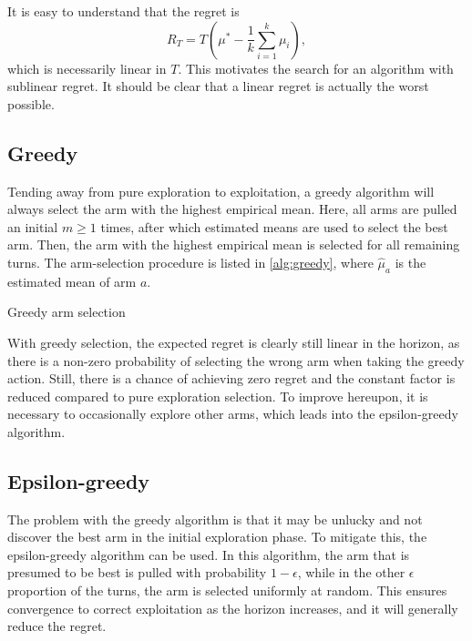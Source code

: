 It is easy to understand that the regret is
\begin{equation}
    R_T = T\left(\mu^* - \frac{1}{k}\sum_{i=1}^k \mu_i\right),
\end{equation}
which is necessarily linear in $T$.
This motivates the search for an algorithm with sublinear regret.
It should be clear that a linear regret is actually the worst possible.

\subsection{Greedy}
Tending away from pure exploration to exploitation, a greedy algorithm will always select the arm with the highest empirical mean.
Here, all arms are pulled an initial $m \geq 1$ times, after which estimated means are used to select the best arm.
Then, the arm with the highest empirical mean is selected for all remaining turns.
The arm-selection procedure is listed in \cref{alg:greedy}, where $\hat{\mu}_a$ is the estimated mean of arm $a$.

\begin{algorithm}
    \caption{Greedy arm selection}
    \label{alg:greedy}
     
\end{algorithm}


With greedy selection, the expected regret is clearly still linear in the horizon, as there is a non-zero probability of selecting the wrong arm when taking the greedy action.
Still, there is a chance of achieving zero regret and the constant factor is reduced compared to pure exploration selection.
To improve hereupon, it is necessary to occasionally explore other arms, which leads into the epsilon-greedy algorithm.

\subsection{Epsilon-greedy}
The problem with the greedy algorithm is that it may be unlucky and not discover the best arm in the initial exploration phase.
To mitigate this, the epsilon-greedy algorithm can be used.
In this algorithm, the arm that is presumed to be best is pulled with probability $1-\epsilon$, while in the other $\epsilon$ proportion of the turns, the arm is selected uniformly at random.
This ensures convergence to correct exploitation as the horizon increases, and it will generally reduce the regret.

